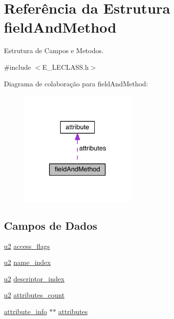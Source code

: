 \hypertarget{structfield_and_method}{}\section{Referência da Estrutura field\+And\+Method}
\label{structfield_and_method}


Estrutura de Campos e Metodos.  




{\ttfamily \#include $<$E\+\_\+\+L\+E\+C\+L\+A\+S\+S.\+h$>$}



Diagrama de colaboração para field\+And\+Method\+:\nopagebreak
\begin{figure}[H]
\begin{center}
\leavevmode
\includegraphics[width=167pt]{structfield_and_method__coll__graph}
\end{center}
\end{figure}
\subsection*{Campos de Dados}
\begin{DoxyCompactItemize}
\item 
\hyperlink{_e___l_e_c_l_a_s_s_8h_a5f223212eef04d10a4550ded680cb1cf}{u2} \hyperlink{structfield_and_method_a04b1604b7553b064887cc578d441d7aa}{access\+\_\+flags}
\item 
\hyperlink{_e___l_e_c_l_a_s_s_8h_a5f223212eef04d10a4550ded680cb1cf}{u2} \hyperlink{structfield_and_method_ac636d7076db5a2ce9891613be8ad9b00}{name\+\_\+index}
\item 
\hyperlink{_e___l_e_c_l_a_s_s_8h_a5f223212eef04d10a4550ded680cb1cf}{u2} \hyperlink{structfield_and_method_a61c33b04e96966edbfd142eea9992834}{descriptor\+\_\+index}
\item 
\hyperlink{_e___l_e_c_l_a_s_s_8h_a5f223212eef04d10a4550ded680cb1cf}{u2} \hyperlink{structfield_and_method_a0b45411cd7a3167fdcfad1af18a799e5}{attributes\+\_\+count}
\item 
\hyperlink{_e___l_e_c_l_a_s_s_8h_a4c2796d61bb99bf730b1807fc838c847}{attribute\+\_\+info} $\ast$$\ast$ \hyperlink{structfield_and_method_a1f7d8a1e074f71abf5ba94e0afee627a}{attributes}
\end{DoxyCompactItemize}


